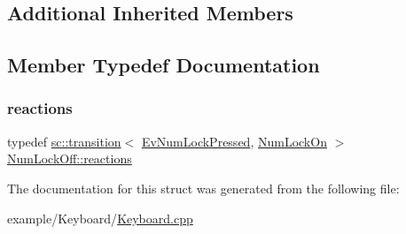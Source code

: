 \subsection*{Additional Inherited Members}


\subsection{Member Typedef Documentation}
\mbox{\label{struct_num_lock_off_ae57735c22d5b1e651f6365ecbf847ab4}} 
\subsubsection{\texorpdfstring{reactions}{reactions}}
{\footnotesize\ttfamily typedef \mbox{\hyperlink{classboost_1_1statechart_1_1transition}{sc\+::transition}}$<$ \mbox{\hyperlink{struct_ev_num_lock_pressed}{Ev\+Num\+Lock\+Pressed}}, \mbox{\hyperlink{struct_num_lock_on}{Num\+Lock\+On}} $>$ \mbox{\hyperlink{struct_num_lock_off_ae57735c22d5b1e651f6365ecbf847ab4}{Num\+Lock\+Off\+::reactions}}}



The documentation for this struct was generated from the following file\+:\begin{DoxyCompactItemize}
\item 
example/\+Keyboard/\mbox{\hyperlink{_keyboard_8cpp}{Keyboard.\+cpp}}\end{DoxyCompactItemize}
